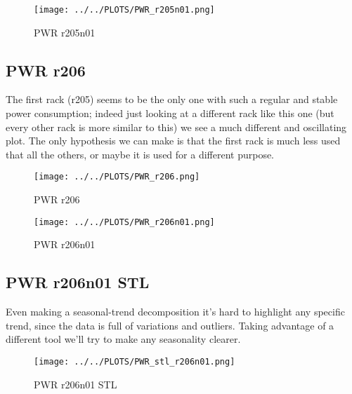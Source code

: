 \vspace{-20pt}

\begin{figure}[H]
\centering
\texttt{[image: ../../PLOTS/PWR\_r205n01.png]}
\captionsetup{skip=-10pt}
\caption{PWR r205n01}
\label{fig:PWR_r205n01}
\end{figure}

\subsection{PWR r206}
The first rack (r205) seems to be the only one with such a regular and stable power consumption; indeed just looking at a different rack like this one (but every other rack is more similar to this) we see a much different and oscillating plot. The only hypothesis we can make is that the first rack is much less used that all the others, or maybe it is used for a different purpose.

\vspace{-12pt}

\begin{figure}[H]
\centering
\texttt{[image: ../../PLOTS/PWR\_r206.png]}
\captionsetup{skip=-10pt}
\caption{PWR r206}
\label{fig:PWR_r206}
\end{figure}

\vspace{-20pt}

\begin{figure}[H]
\centering
\texttt{[image: ../../PLOTS/PWR\_r206n01.png]}
\captionsetup{skip=-10pt}
\caption{PWR r206n01}
\label{fig:PWR_r206n01}
\end{figure}

\subsection{PWR r206n01 STL}
Even making a seasonal-trend decomposition it’s hard to highlight any specific trend, since the data is full of variations and outliers. Taking advantage of a different tool we’ll try to make any seasonality clearer.

\vspace{-10pt}

\begin{figure}[H]
\centering
\texttt{[image: ../../PLOTS/PWR\_stl\_r206n01.png]}
\caption{PWR r206n01 STL}
\label{fig:PWR_stl_r206n01}
\end{figure}

